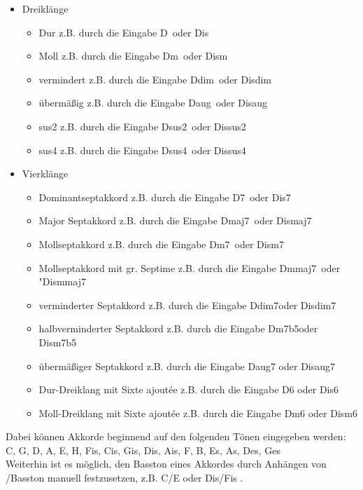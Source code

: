\documentclass[11.5pt,a4paper]{article}
\begin{document}
	\begin{itemize}
		\item Dreiklänge 
		\begin{itemize}
			\item Dur z.B. durch die Eingabe \glqq D\grqq \ oder \glqq Dis\grqq
			\item Moll z.B. durch die Eingabe \glqq Dm\grqq \ oder \glqq Dism\grqq
			\item vermindert z.B. durch die Eingabe \glqq Ddim\grqq \ oder \glqq Disdim\grqq
			\item übermäßig z.B. durch die Eingabe \glqq Daug\grqq \ oder \glqq Disaug\grqq
			\item sus2 z.B. durch die Eingabe \glqq Dsus2\grqq \ oder \glqq Dissus2\grqq
			\item sus4 z.B. durch die Eingabe \glqq Dsus4\grqq \ oder \glqq Dissus4\grqq
		\end{itemize}
		\item Vierklänge
		\begin{itemize}
			\item Dominantseptakkord z.B. durch die Eingabe \glqq D7\grqq \ oder \glqq Dis7\grqq
			\item Major Septakkord z.B. durch die Eingabe \glqq Dmaj7\grqq \ oder \glqq Dismaj7\grqq
			\item Mollseptakkord z.B. durch die Eingabe \glqq Dm7\grqq \ oder \glqq Dism7\grqq
			\item Mollseptakkord mit gr. Septime z.B. durch die Eingabe \glqq Dmmaj7\grqq \ oder "Dismmaj7\grqq
			\item verminderter Septakkord z.B. durch die Eingabe \glqq Ddim7\grqq oder \glqq Disdim7\grqq
			\item halbverminderter Septakkord z.B. durch die Eingabe \glqq Dm7b5\grqq oder \glqq Dism7b5\grqq
			\item übermäßiger Septakkord z.B. durch die Eingabe \glqq Daug7 \grqq oder \glqq Disaug7\grqq
			\item Dur-Dreiklang mit Sixte ajoutée z.B. durch die Eingabe \glqq D6 \grqq oder \glqq Dis6\grqq
			\item Moll-Dreiklang mit Sixte ajoutée z.B. durch die Eingabe \glqq Dm6 \grqq oder \glqq Dism6\grqq
		\end{itemize}
	\end{itemize}
 Dabei können Akkorde beginnend auf den folgenden Tönen eingegeben werden:  \\
  C, G, D, A, E, H, Fis, Cis, Gis, Dis, Ais, F, B, Es, As, Des, Ges \\
 Weiterhin ist es möglich, den Basston eines Akkordes durch Anhängen von \glqq /Basston \grqq manuell festzusetzen, z.B. \glqq C/E \grqq oder \glqq Dis/Fis \grqq.
  
\end{document}
